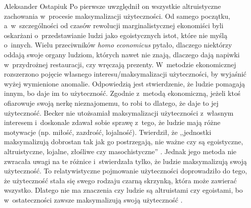 \begin{artplenv}{Aleksander Ostapiuk}
Po pierwsze uwzględnił on wszystkie altruistyczne zachowania w~procesie maksymalizacji użyteczności. Od samego początku,
a~w~szczególności od czasów rewolucji marginalistycznej ekonomiści byli oskarżani o~przedstawianie ludzi jako
egoistycznych istot, które nie myślą o~innych. Wielu przeciwników \textit{homo economicus} pytało, dlaczego niektórzy
oddają swoje organy ludziom, których nawet nie znają, dlaczego dają napiwki w~przydrożnej restauracji, czy wręczają
prezenty. W~metodzie ekonomicznej rozszerzono pojęcie własnego interesu/maksymalizacji użyteczności, by wyjaśnić wyżej
wymienione anomalie. Odpowiedzią jest stwierdzenie, że ludzie pomagają innym, bo daje im to użyteczność.
Zgodnie z~metodą ekonomiczną, jeżeli ktoś ofiarowuje swoją nerkę nieznajomemu, to robi to dlatego, że daje to jej
użyteczność. Becker nie utożsamiał maksymalizacji użyteczności z~własnym interesem i~doskonale zdawał sobie
sprawę z~tego, że ludzie mają różne motywacje (np. miłość, zazdrość, lojalność). Twierdził, że ,,jednostki maksymalizują
dobrostan tak jak go postrzegają, nie ważne czy są egoistyczne, altruistyczne, lojalne, złośliwe czy masochistyczne''
\parencite[s.~386]{becker_economic_1993}.
Jednak jego metoda nie zwracała uwagi na te różnice i~stwierdzała
tylko, że ludzie maksymalizują swoją użyteczność. To relatywistyczne pojmowanie użyteczności doprowadziło do tego, że
użyteczność stała się swego rodzaju czarną skrzynką, która może zawierać wszystko. Dlatego nie ma znaczenia czy ludzie
są altruistami czy egoistami, bo w~ostateczności zawsze maksymalizują swoją użyteczność
\parencite{sen_rational_1977}.


\end{artplenv}
